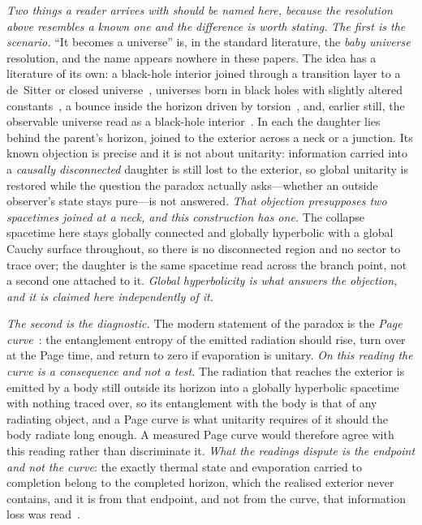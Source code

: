\documentclass[11pt,a4paper]{article}
\theoremstyle{plain}
\theoremstyle{definition}
\theoremstyle{remark}
\begin{document}
\emph{Two things a reader arrives with should be named here, because the resolution above resembles a known one and the difference is worth stating.}
\emph{The first is the scenario.} ``It becomes a universe'' is, in the standard literature, the \emph{baby universe} resolution, and the name appears nowhere in these papers. The idea has a literature of its own: a black-hole interior joined through a transition layer to a de~Sitter or closed universe~\cite{FrolovMarkovMukhanov1989}, universes born in black holes with slightly altered constants~\cite{Smolin1992}, a bounce inside the horizon driven by torsion~\cite{Poplawski2010}, and, earlier still, the observable universe read as a black-hole interior~\cite{Pathria1972}. In each the daughter lies behind the parent's horizon, joined to the exterior across a neck or a junction. Its known objection is precise and it is not about unitarity: information carried into a \emph{causally disconnected} daughter is still lost to the exterior, so global unitarity is restored while the question the paradox actually asks---whether an outside observer's state stays pure---is not answered. \emph{That objection presupposes two spacetimes joined at a neck, and this construction has one.} The collapse spacetime here stays globally connected and globally hyperbolic with a global Cauchy surface throughout, so there is no disconnected region and no sector to trace over; the daughter is the same spacetime read across the branch point, not a second one attached to it. \emph{Global hyperbolicity is what answers the objection, and it is claimed here independently of it.}


\emph{The second is the diagnostic.} The modern statement of the paradox is the \emph{Page curve}~\cite{Page1993}: the entanglement entropy of the emitted radiation should rise, turn over at the Page time, and return to zero if evaporation is unitary. \emph{On this reading the curve is a consequence and not a test.} The radiation that reaches the exterior is emitted by a body still outside its horizon into a globally hyperbolic spacetime with nothing traced over, so its entanglement with the body is that of any radiating object, and a Page curve is what unitarity requires of it should the body radiate long enough. A measured Page curve would therefore agree with this reading rather than discriminate it.
\emph{What the readings dispute is the endpoint and not the curve}: the exactly thermal state and evaporation carried to completion belong to the completed horizon, which the realised exterior never contains, and it is from that endpoint, and not from the curve, that information loss was read~\cite{JanzenBHcausality}.
\end{document}
